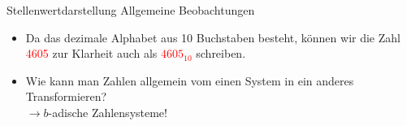 \begin{frame}{Stellenwertdarstellung}
    Allgemeine Beobachtungen
    \begin{itemize}
        \item Da das dezimale Alphabet aus 10 Buchstaben besteht, können wir die Zahl \textcolor{red}{4605} zur Klarheit auch als \textcolor{red}{$4605_{10}$} schreiben.\\
        
        \item<3-> Wie kann man Zahlen allgemein vom einen System in ein anderes Transformieren?\\
        $\rightarrow b$-adische Zahlensysteme!
    \end{itemize}
\end{frame}

